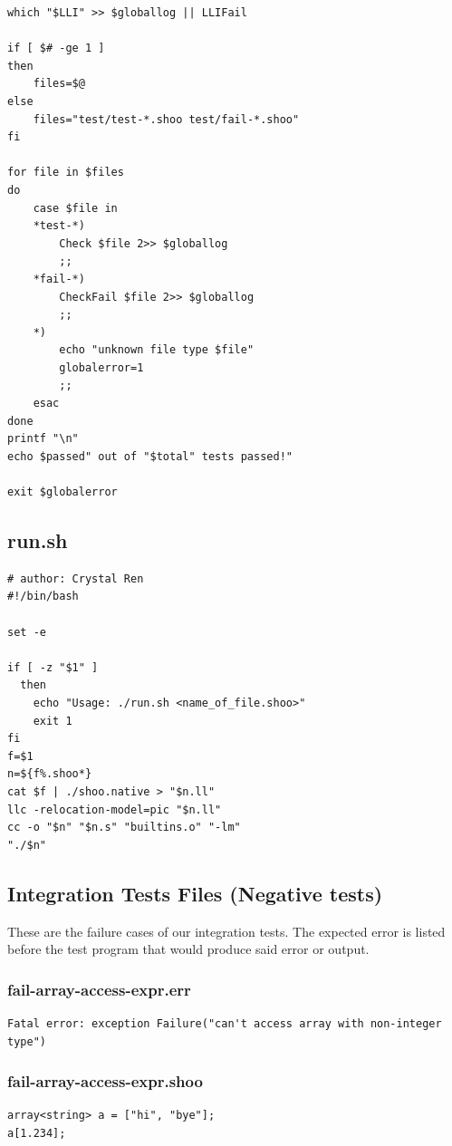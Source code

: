 \documentclass[12pt]{article}
\begin{document}
\begin{mdframed}[hidealllines=true,backgroundcolor=blue!20]
\begin{lstlisting}
which "$LLI" >> $globallog || LLIFail

if [ $# -ge 1 ]
then
    files=$@
else
    files="test/test-*.shoo test/fail-*.shoo"
fi

for file in $files
do
    case $file in
	*test-*)
	    Check $file 2>> $globallog
	    ;;
	*fail-*)
	    CheckFail $file 2>> $globallog
	    ;;
	*)
	    echo "unknown file type $file"
	    globalerror=1
	    ;;
    esac
done
printf "\n"
echo $passed" out of "$total" tests passed!"

exit $globalerror
\end{lstlisting}
\end{mdframed}

\subsection{run.sh}
\begin{mdframed}[hidealllines=true,backgroundcolor=blue!20]
\begin{lstlisting}
# author: Crystal Ren
#!/bin/bash

set -e

if [ -z "$1" ]
  then
    echo "Usage: ./run.sh <name_of_file.shoo>"
    exit 1
fi
f=$1
n=${f%.shoo*}
cat $f | ./shoo.native > "$n.ll"
llc -relocation-model=pic "$n.ll"
cc -o "$n" "$n.s" "builtins.o" "-lm"
"./$n"
\end{lstlisting}
\end{mdframed}

\subsection{Integration Tests Files (Negative tests)}
These are the failure cases of our integration tests. The expected error is listed before the test program that would produce said error or output.\\

\subsubsection{fail-array-access-expr.err}
\begin{mdframed}[hidealllines=true,backgroundcolor=green!10]
\begin{lstlisting}
Fatal error: exception Failure("can't access array with non-integer type")
\end{lstlisting}
\end{mdframed}
\subsubsection{fail-array-access-expr.shoo}
\begin{mdframed}[hidealllines=true,backgroundcolor=blue!10]
\begin{lstlisting}
array<string> a = ["hi", "bye"];
a[1.234];

\end{lstlisting}
\end{mdframed}
\end{document}

